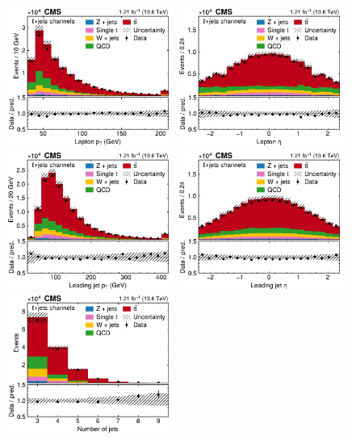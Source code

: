 \begin{figure}[!p]
\centering
\includegraphics[width=0.49\textwidth]{figures/ttxs/lep_pt_lj.pdf}
\hfill
\includegraphics[width=0.49\textwidth]{figures/ttxs/lep_eta_lj.pdf}
\includegraphics[width=0.49\textwidth]{figures/ttxs/1st_jet_pt_lj.pdf}
\hfill
\includegraphics[width=0.49\textwidth]{figures/ttxs/1st_jet_eta_lj.pdf}
\includegraphics[width=0.49\textwidth]{figures/ttxs/njet_lj.pdf}

\end{figure}

